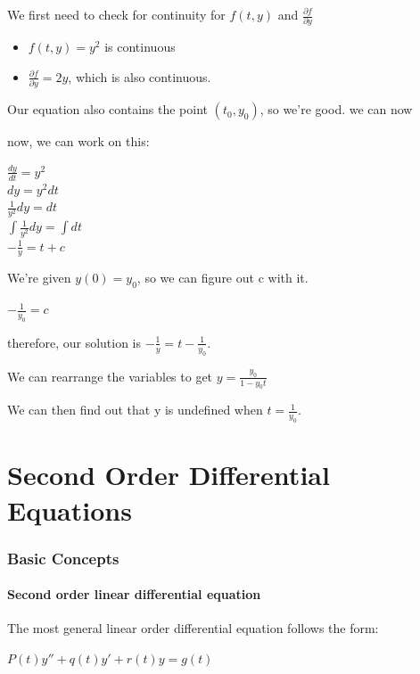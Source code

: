 \documentclass{article}
\begin{document}
We first need to check for continuity for $f(t,y)$ and $\frac{\partial f}{\partial y}$
\begin{itemize}
    \item $f(t,y) = y^2$ is continuous
    \item $\frac{\partial f}{\partial y} = 2y$, which is also continuous.
\end{itemize}

Our equation also contains the point $(t_0,y_0)$, so we're good. we can now 

now, we can work on this:

\begin{center}
    $\frac{dy}{dt} = y^2$ \\
    $dy = y^2 dt$\\
    $\frac{1}{y^2} dy = dt$ \\
    $\int \frac{1}{y^2} dy = \int dt$ \\
    $-\frac{1}{y} = t + c$
\end{center}

We're given $y(0) = y_0$, so we can figure out c with it.

\begin{center}
    $- \frac{1}{y_0} = c$
\end{center}

therefore, our solution is $-\frac{1}{y} = t - \frac{1}{y_0}$.

We can rearrange the variables to get $y = \frac{y_0}{1 - y_0 t}$

We can then find out that y is undefined when $t = \frac{1}{y_0}$.

\part{Second Order Differential Equations}

\section{Basic Concepts}

\subsection{Second order linear differential equation}
The most general linear order differential equation follows the form:

\begin{center}
    $P(t)y'' + q(t)y' + r(t)y = g(t)$
\end{center}
\end{document}
